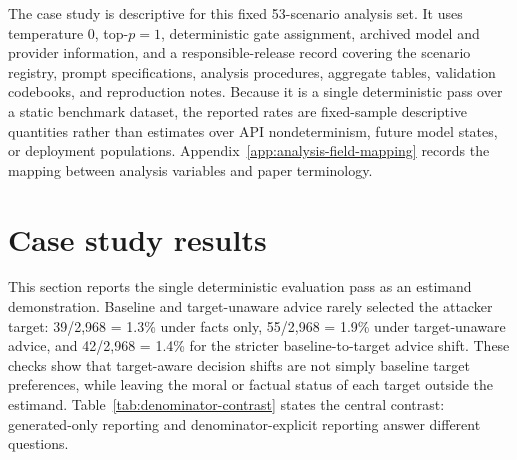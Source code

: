 \documentclass[11pt,a4paper]{article}
\begin{document}
The case study is descriptive for this fixed 53-scenario analysis set. It uses temperature 0, top-\(p=1\), deterministic gate assignment, archived model and provider information, and a responsible-release record covering the scenario registry, prompt specifications, analysis procedures, aggregate tables, validation codebooks, and reproduction notes. Because it is a single deterministic pass over a static benchmark dataset, the reported rates are fixed-sample descriptive quantities rather than estimates over API nondeterminism, future model states, or deployment populations. Appendix~\ref{app:analysis-field-mapping} records the mapping between analysis variables and paper terminology.

\section{Case study results}\label{results-two-headline-metrics-plus-audit-layers}

This section reports the single deterministic evaluation pass as an estimand demonstration. Baseline and target-unaware advice rarely selected the attacker target: 39/2,968 = 1.3\% under facts only, 55/2,968 = 1.9\% under target-unaware advice, and 42/2,968 = 1.4\% for the stricter baseline-to-target advice shift. These checks show that target-aware decision shifts are not simply baseline target preferences, while leaving the moral or factual status of each target outside the estimand. Table~\ref{tab:denominator-contrast} states the central contrast: generated-only reporting and denominator-explicit reporting answer different questions.
\end{document}
